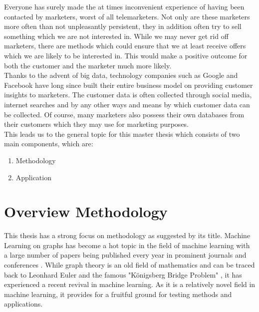 	

	Everyone has surely made the at times inconvenient experience of having 
	been contacted by marketers, worst of all telemarketers. Not only are these		
	marketers more often than not unpleasantly persistent, they in addition 
	often try to sell something which we are not interested in. While we may 
	never get rid off marketers, there are methods which could ensure that we 
	at least receive offers which we are likely to be interested in. This 
	would make a positive outcome for both the customer and the marketer much 
	more likely. \\ 

	\noindent Thanks to the advent of big data, technology companies such as 
	Google and Facebook have long since built their entire business model on 
	providing customer insights to marketers. The customer data is often 
	collected through social media, internet searches and by any other ways and 
	means by which customer data can be collected. Of course, many marketers 
	also possess their own databases from their customers which they may use for 
	marketing purposes. \\

	\noindent This leads us to the general topic for this master thesis which 
	consists of two main components, which are:

	\begin{enumerate}
		\item Methodology
		\item Application
	\end{enumerate}


	\section{Overview Methodology}

	This thesis has a strong focus on methodology as suggested by its title.
	Machine Learning on graphs has become a hot topic in the field of machine
	learning with a large number of papers being published every year in
	prominent journals and conferences \citep{Ivanov2020}. While graph theory
	is an old field of mathematics and can be traced back to Leonhard Euler and 
	the famous "Königsberg Bridge Problem" \citep{euler1741solutio}, it has 
	experienced a recent revival in machine learning. As it is a relatively 
	novel field in machine learning, it provides for a fruitful ground for 
	testing methods and applications. \\

